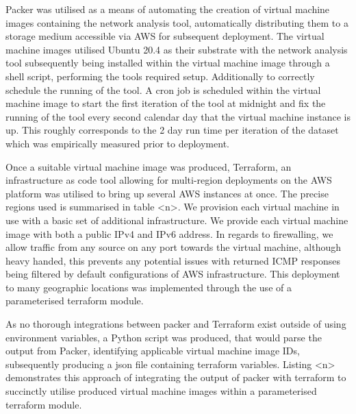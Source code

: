 \documentclass{l4proj}
\begin{document}
Packer was utilised as a means of automating the creation of virtual machine images containing the network analysis tool, automatically distributing them to a storage medium accessible via AWS for subsequent deployment. The virtual machine images utilised Ubuntu 20.4 as their substrate with the network analysis tool subsequently being installed within the virtual machine image through a shell script, performing the tools required setup. Additionally to correctly schedule the running of the tool. A cron job is scheduled within the virtual machine image to start the first iteration of the tool at midnight and fix the running of the tool every second calendar day that the virtual machine instance is up. This roughly corresponds to the 2 day run time per iteration of the dataset which was empirically measured prior to deployment.

Once a suitable virtual machine image was produced, Terraform, an infrastructure as code tool allowing for multi-region deployments on the AWS platform was utilised to bring up several AWS instances at once. The precise regions used is summarised in table <n>. We provision each virtual machine in use with a basic set of additional infrastructure. We provide each virtual machine image with both a public IPv4 and IPv6 address. In regards to firewalling, we allow traffic from any source on any port towards the virtual machine, although heavy handed, this prevents any potential issues with returned ICMP responses being filtered by default configurations of AWS infrastructure. This deployment to many geographic locations was implemented through the use of a parameterised terraform module.

As no thorough integrations between packer and Terraform exist outside of using environment variables, a Python script was produced, that would parse the output from Packer, identifying applicable virtual machine image IDs, subsequently producing a json file containing terraform variables. Listing <n> demonstrates this approach of integrating the output of packer with terraform to succinctly utilise produced virtual machine images within a parameterised terraform module.
\end{document}
